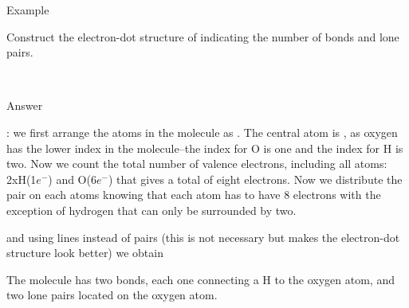 \documentclass[main.tex]{subfiles}
\begin{document}
\begin{example}{Example}
\begin{it} 
Construct the electron-dot structure of  indicating the number of bonds and lone pairs.
\end{it}\\
\Sepline
\begin{bf}Answer\end{bf}: we first arrange the atoms in the molecule as \hspace{.05in}\hspace{.05in}. The central atom is , as oxygen has the lower index in the  molecule--the index for O is one and the index for H is two. Now we count the total number of valence electrons, including all atoms: 2xH(1$e^-$) and O(6$e^-$) that gives a total of eight electrons. Now we distribute the pair on each atoms knowing that each atom has to have 8 electrons with the exception of hydrogen that can only be surrounded by two.
\begin{center}\hspace{.05in}\hspace{.05in}\hspace{.05in}\end{center} 
and using lines instead of pairs (this is not necessary but makes the electron-dot structure look better) we obtain
\begin{center}\hspace{.05in} \end{center}
The molecule has two bonds, each one connecting a H to the oxygen atom, and two lone pairs located on the oxygen atom.
\end{example}
\end{document}
